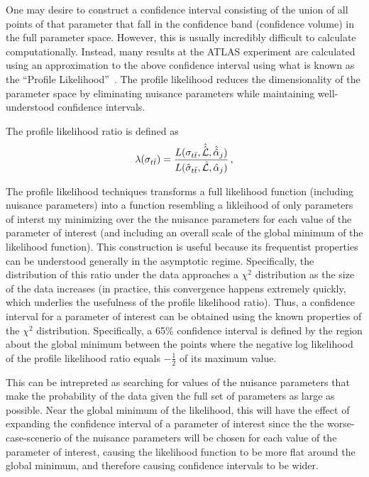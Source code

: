One may desire to construct a confidence interval consisting of the union of all points of that parameter that fall in the confidence band (confidence volume) in the full parameter space.
However, this is usually incredibly difficult to calculate computationally.
Instead, many results at the ATLAS experiment are calculated using an approximation to the above confidence interval using what is known as the ``Profile Likelihood''~\cite{ATL-CONF-2011-034}.
The profile likelihood reduces the dimensionality of the parameter space by eliminating nuisance parameters while maintaining well-understood confidence intervals.

The profile likelihood ratio is defined as
\begin{equation}
  \lambda(\sigma_{t\bar{t}}) = \frac{L(\sigma_{t\bar{t}}, \hat{\hat{{\cal L}}}, \hat{\hat{\alpha}}_j)}{L(\hat \sigma_{t\bar{t}}, \hat {{\cal L}}, \hat \alpha_j)}\,,
\end{equation}

The profile likelihood techniques transforms a full likelihood function (including nuisance parameters) into a function resembling a likleihood of only parameters of interst my minimizing over the the nuisance parameters for each value of the parameter of interest (and including an overall scale of the global minimum of the likelihood function).
This construction is useful because its frequentist properties can be understood generally in the asymptotic regime.
Specifically, the distribution of this ratio under the data approaches a $\chi^2$ distribution as the size of the data increases (in practice, this convergence happens extremely quickly, which underlies the usefulness of the profile likelihood ratio).
Thus, a confidence interval for a parameter of interest can be obtained using the known properties of the $\chi^2$ distribution.
Specifically, a 65\% confidence interval is defined by the region about the global minimum between the points where the negative log likelihood of the profile likelihood ratio equals $-\frac{1}{2}$ of its maximum value.

This can be intrepreted as searching for values of the nuisance parameters that make the probability of the data given the full set of parameters as large as possible.
Near the global minimum of the likelihood, this will have the effect of expanding the confidence interval of a parameter of interest since the the worse-case-scenerio of the nuisance parameters will be chosen for each value of the parameter of interest, causing the likelihood function to be more flat around the global minimum, and therefore causing confidence intervals to be wider.

